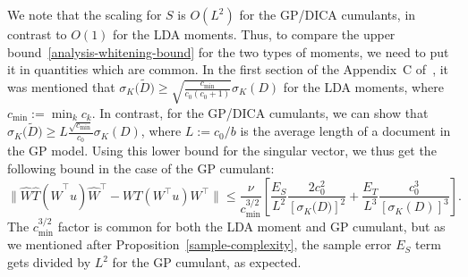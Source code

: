 \documentclass{article}
\newcommand{\normp}[1]{\|#1\|}
\newcommand{\sbra}[1]{\left[#1\right]}
\newcommand{\wt}[1]{\widetilde{#1}}
\newcommand{\wh}[1]{\widehat{#1}}
\begin{document}
We note that the scaling for $S$ is $O(L^2)$ for the GP/DICA cumulants, in contrast to $O(1)$ for the LDA moments. Thus, to compare the upper bound~\eqref{analysis-whitening-bound} for the two types of moments, we need to put it in quantities which are common. In the first section of the Appendix~C of~\cite{AnaEtAl2013}, it was mentioned that  $\sigma_K\big(\wt{D}\big) \geq \sqrt{\frac{c_{\mathrm{min}}}{c_0 (c_0+1)}} \sigma_K(D)$ for the LDA moments, where $c_{\mathrm{min}} := \min_k c_k$. In contrast, for the GP/DICA cumulants, we can show that $\sigma_K\big(\wt{D}\big) \geq L \frac{\sqrt{c_{\mathrm{min}}}}{c_0} \sigma_K(D)$, where $L := c_0/b$ is the average length of a document in the GP model. Using this lower bound for the singular vector, we thus get the following bound in the case of the GP cumulant:
\begin{equation} \label{eq:W_bound_us}
\normp{\wh{W} \wh{T}(\wh{W}^{\top}u) \wh{W}^{\top} - WT(W^{\top} u)W^{\top}} 
 \le \frac{\nu}{c_{\mathrm{min}}^{3/2}}\sbra{\frac{E_S}{L^2} \frac{ 2c_0^2 }{\sbra{ \sigma_K\big(D\big) }^2 } + \frac{E_T}{L^3} \frac{c_0^3}{ { \sbra{\sigma_K(D)}^3 } } }.
\end{equation}
The $c_{\mathrm{min}}^{3/2}$ factor is common for both the LDA moment and GP cumulant, but as we mentioned after Proposition~\ref{sample-complexity}, the sample error $E_S$ term gets divided by $L^2$ for the GP cumulant, as expected.
\end{document}
